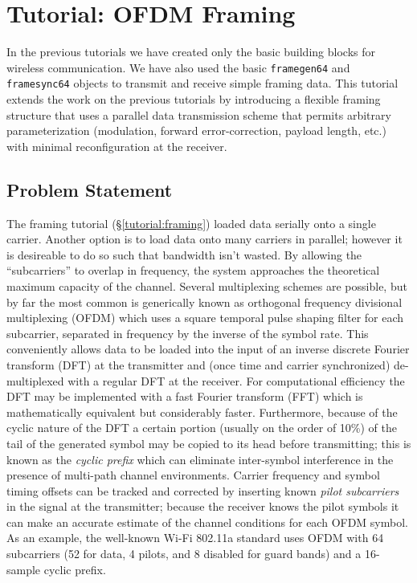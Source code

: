 % 
%

\newpage
\section{Tutorial: OFDM Framing}
\label{tutorial:ofdmflexframe}

In the previous tutorials we have created only the basic building blocks
for wireless communication.
We have also used the basic {\tt framegen64} and {\tt framesync64}
objects to transmit and receive simple framing data.
This tutorial extends the work on the previous tutorials by introducing
a flexible framing structure that uses a parallel data transmission
scheme that permits arbitrary parameterization
(modulation, forward error-correction, payload length, etc.)
with minimal reconfiguration at the receiver.


%
%
\subsection{Problem Statement}
\label{tutorial:ofdmflexframe:problem}
The framing tutorial (\S\ref{tutorial:framing}) loaded data serially
onto a single carrier.
Another option is to load data onto many carriers in parallel;
however it is desireable to do so such that bandwidth isn't wasted.
By allowing the ``subcarriers'' to overlap in frequency,
the system approaches the theoretical maximum capacity of the channel.
Several multiplexing schemes are possible,
but by far the most common is generically known as
orthogonal frequency divisional multiplexing (OFDM)
which uses a square temporal pulse shaping filter for each subcarrier,
separated in frequency by the inverse of the symbol rate.
This conveniently allows data to be loaded into the input of an inverse
discrete Fourier transform (DFT) at the transmitter and
(once time and carrier synchronized)
de-multiplexed with a regular DFT at the receiver.
For computational efficiency the DFT may be implemented with a fast
Fourier transform (FFT) which is mathematically equivalent
but considerably faster.
Furthermore, because of the cyclic nature of the DFT a certain portion
(usually on the order of 10\%)
of the tail of the generated symbol may be copied to its head before
transmitting;
this is known as the {\em cyclic prefix} which can eliminate
inter-symbol interference in the presence of multi-path channel
environments.
Carrier frequency and symbol timing offsets can be tracked and corrected
by inserting known {\em pilot subcarriers} in the signal at the
transmitter;
because the receiver knows the pilot symbols it can make an accurate
estimate of the channel conditions for each OFDM symbol.
%
%
As an example, the well-known Wi-Fi 802.11a standard uses OFDM with
64 subcarriers
(52 for data, 4 pilots, and 8 disabled for guard bands)
and a 16-sample cyclic prefix.
%

